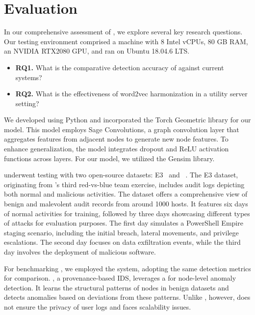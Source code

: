  \section{Evaluation}
 \label{sec:eval}

 In our comprehensive assessment of \Sys, we explore several key research questions. Our testing environment comprised a machine with 8 Intel vCPUs, 80 GB RAM, an NVIDIA RTX2080 GPU, and ran on Ubuntu 18.04.6 LTS.


\begin{itemize}[leftmargin=*]
\item \textbf{RQ1.} What is the comparative detection accuracy of \Sys against current systems?
\item \textbf{RQ2.} What is the effectiveness of word2vec harmonization in a utility server setting?
\end{itemize}

 We developed \Sys using Python and incorporated the Torch Geometric library for our \gnnshort model. This model employs Sage Convolutions, a graph convolution layer that aggregates features from adjacent nodes to generate new node features. To enhance generalization, the model integrates dropout and ReLU activation functions across layers. For our \wordvec model, we utilized the Gensim library.

 \Sys underwent testing with two open-source datasets: \darpa E3~\cite{darpae3} and \darpa \optc~\cite{darpatc}. The E3 dataset, originating from \darpa's third red-vs-blue team exercise, includes audit logs depicting both normal and malicious activities. The \darpa \optc dataset offers a comprehensive view of benign and malevolent audit records from around 1000 hosts. It features six days of normal activities for training, followed by three days showcasing different types of attacks for evaluation purposes. The first day simulates a PowerShell Empire staging scenario, including the initial breach, lateral movements, and privilege escalations. The second day focuses on data exfiltration events, while the third day involves the deployment of malicious software.

 For benchmarking \Sys, we employed the \threatrace \cite{wang2022threatrace} system, adopting the same detection metrics for comparison. \threatrace, a provenance-based IDS, leverages a \gnn for node-level anomaly detection. It learns the structural patterns of nodes in benign datasets and detects anomalies based on deviations from these patterns. Unlike \Sys, however, \threatrace does not ensure the privacy of user logs and faces scalability issues.

